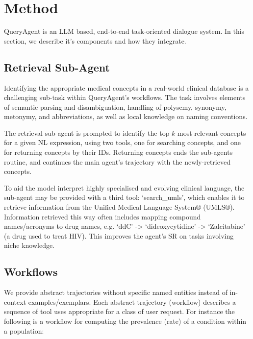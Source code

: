 \documentclass[11pt]{article}
\begin{document}
\section{Method}

QueryAgent is an LLM based, end-to-end task-oriented dialogue system.
In this section, we describe it's components and how they integrate.

\subsection{Retrieval Sub-Agent}
Identifying the appropriate medical concepts in a real-world clinical database is a challenging sub-task within QueryAgent's workflows.
The task involves elements of semantic parsing and disambiguation, handling of polysemy, synonymy, metonymy, and abbreviations, as well as local knowledge on naming conventions.

The retrieval sub-agent is prompted to identify the top-$k$ most relevant concepts for a given NL expression, using two tools, one for searching concepts, and one for returning concepts by their IDs.
Returning concepts ends the sub-agents routine, and continues the main agent's trajectory with the newly-retrieved concepts.

To aid the model interpret highly specialised and evolving clinical language, the sub-agent may be provided with a third tool: `search\_umls', which enables it to retrieve information from the Unified Medical Language System® (UMLS®).
Information retrieved this way often includes mapping compound names/acronyms to drug names, e.g. `ddC' -> `dideoxycytidine' -> `Zalcitabine' (a drug used to treat HIV).
This improves the agent's SR on tasks involving niche knowledge.


\subsection{Workflows}

We provide abstract trajectories without specific named entities instead of in-context examples/exemplars.
Each abstract trajectory (workflow) describes a sequence of tool uses appropriate for a class of user request.
For instance the following is a workflow for computing the prevalence (rate) of a condition within a population:
\end{document}
